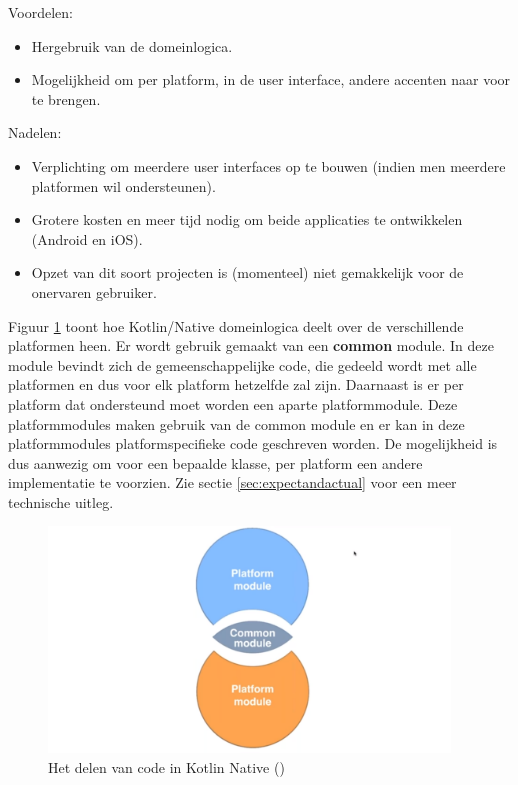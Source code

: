 Voordelen:
\begin{itemize}
	\item Hergebruik van de domeinlogica.
	\item Mogelijkheid om per platform, in de user interface, andere accenten naar voor te brengen.
\end{itemize}

Nadelen:
\begin{itemize}
	\item Verplichting om meerdere user interfaces op te bouwen (indien men meerdere platformen wil ondersteunen).
	\item Grotere kosten en meer tijd nodig om beide applicaties te ontwikkelen (Android en iOS).
	\item Opzet van dit soort projecten is (momenteel) niet gemakkelijk voor de onervaren gebruiker.
\end{itemize}

Figuur \ref{fig:sharingcode} toont hoe Kotlin/Native domeinlogica deelt over de verschillende platformen heen. Er wordt gebruik gemaakt van een \textbf{common} module. In deze module bevindt zich de gemeenschappelijke code, die gedeeld wordt met alle platformen en dus voor elk platform hetzelfde zal zijn. Daarnaast is er per platform dat ondersteund moet worden een aparte platformmodule. Deze platformmodules maken gebruik van de common module en er kan in deze platformmodules platformspecifieke code geschreven worden. De mogelijkheid is dus aanwezig om voor een bepaalde klasse, per platform een andere implementatie te voorzien. Zie sectie \ref{sec:expectandactual} voor een meer technische uitleg.

\begin{figure} [ht]
	\centering
	\includegraphics[width=0.95\textwidth]{img/sharingcode}
	\caption{Het delen van code in Kotlin Native (\cite{Developine})}
	\label{fig:sharingcode}
\end{figure}


